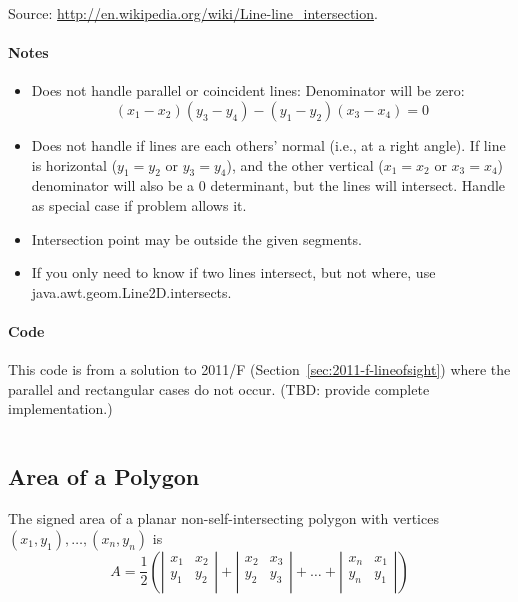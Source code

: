 Source: \href{http://en.wikipedia.org/wiki/Line-line_intersection}{http://en.wikipedia.org/wiki/Line-line\_intersection}.

\paragraph{Notes}
\begin{itemize}
\item Does not handle parallel or coincident lines:
    Denominator will be zero:
    \[
        (x_1 - x_2) (y_3 - y_4) - (y_1 - y_2) (x_3 - x_4) = 0
    \]
\item Does not handle if lines are each others' normal (i.e., at a right angle).
    If line is horizontal ($y_1 = y_2$ or $y_3 = y_4$), and the other vertical ($x_1 = x_2$ or $x_3 = x_4$) 
    denominator will also be a 0 determinant, but the lines will intersect.  
    Handle as special case if problem allows it.

\item Intersection point may be outside the given segments.

\item If you only need to know if two lines intersect, but not where, use java.awt.geom.Line2D.intersects.
\end{itemize}

\paragraph{Code}

This code is from a solution to 2011/F (Section~\ref{sec:2011-f-lineofsight}) where the 
parallel and rectangular cases do not occur. (TBD: provide complete implementation.)

\inputminted{java}{code/lineintersection.java}

%
%
%

\subsection{Area of a Polygon}
\label{sec:areapolygon}

The signed area of a planar non-self-intersecting polygon with vertices $(x_1, y_1), \dots, (x_n, y_n)$ is
\[
    A = \frac{1}{2} \left(
        \left\vert
        \begin{array}{cc}
            x_1 & x_2 \\
            y_1 & y_2 \\
        \end{array}
        \right\vert
        +
        \left\vert
        \begin{array}{cc}
            x_2 & x_3 \\
            y_2 & y_3 \\
        \end{array}
        \right\vert
        + \ldots +
        \left\vert
        \begin{array}{cc}
            x_n & x_1 \\
            y_n & y_1 \\
        \end{array}
        \right\vert
        \right)
\]

